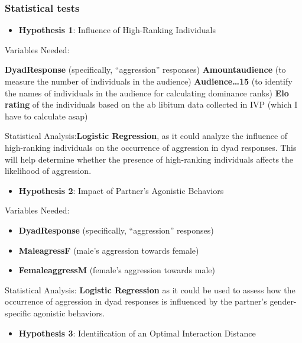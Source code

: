 \documentclass[
]{article}
\providecommand{\tightlist}{%
  \setlength{\itemsep}{0pt}\setlength{\parskip}{0pt}}
\begin{document}
\hypertarget{statistical-tests}{%
\subsubsection{Statistical tests}\label{statistical-tests}}

\begin{itemize}
\tightlist
\item
  \textbf{Hypothesis 1}: Influence of High-Ranking Individuals
\end{itemize}

Variables Needed:

\textbf{DyadResponse} (specifically, ``aggression'' responses)
\textbf{Amountaudience} (to measure the number of individuals in the
audience) \textbf{Audience\ldots15} (to identify the names of
individuals in the audience for calculating dominance ranks) \textbf{Elo
rating} of the individuals based on the ab libitum data collected in IVP
(which I have to calculate asap)

Statistical Analysis:\textbf{Logistic Regression}, as it could analyze
the influence of high-ranking individuals on the occurrence of
aggression in dyad responses. This will help determine whether the
presence of high-ranking individuals affects the likelihood of
aggression.

\begin{itemize}
\tightlist
\item
  \textbf{Hypothesis 2}: Impact of Partner's Agonistic Behaviors
\end{itemize}

Variables Needed:

\begin{itemize}
\tightlist
\item
  \textbf{DyadResponse} (specifically, ``aggression'' responses)
\item
  \textbf{MaleagressF} (male's aggression towards female)
\item
  \textbf{FemaleaggressM} (female's aggression towards male)
\end{itemize}

Statistical Analysis: \textbf{Logistic Regression} as it could be used
to assess how the occurrence of aggression in dyad responses is
influenced by the partner's gender-specific agonistic behaviors.

\begin{itemize}
\tightlist
\item
  \textbf{Hypothesis 3}: Identification of an Optimal Interaction
  Distance
\end{itemize}
\end{document}
